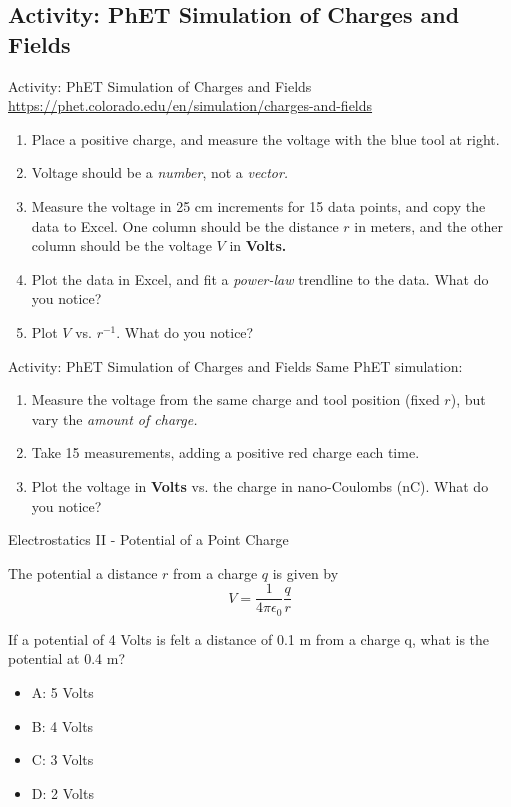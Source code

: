 \documentclass{beamer}
\begin{document}
\subsection{Activity: PhET Simulation of Charges and Fields}

\begin{frame}{Activity: PhET Simulation of Charges and Fields}
\small
\url{https://phet.colorado.edu/en/simulation/charges-and-fields} \\
\begin{enumerate}
\item Place a positive charge, and measure the voltage with the blue tool at right.
\item Voltage should be a \textit{number}, not a \textit{vector.}
\item Measure the voltage in 25 cm increments for 15 data points, and copy the data to Excel.  One column should be the distance $r$ in meters, and the other column should be the voltage $V$ in \textbf{Volts.}
\item Plot the data in Excel, and fit a \textit{power-law} trendline to the data.  What do you notice?
\item Plot $V$ vs. $r^{-1}$.  What do you notice?
\end{enumerate}
\end{frame}

\begin{frame}{Activity: PhET Simulation of Charges and Fields}
Same PhET simulation:
\begin{enumerate}
\item Measure the voltage from the same charge and tool position (fixed $r$), but vary the \textit{amount of charge.}
\item Take 15 measurements, adding a positive red charge each time.
\item Plot the voltage in \textbf{Volts} vs. the charge in nano-Coulombs (nC).  What do you notice?
\end{enumerate}
\end{frame}

\begin{frame}{Electrostatics II - Potential of a Point Charge}
\begin{tcolorbox}[colback=white,colframe=gray,title=Potential of a Point Charge]
The potential a distance $r$ from a charge $q$ is given by
\begin{equation}
\boxed{
V = \frac{1}{4\pi \epsilon_0} \frac{q}{r}} \label{eq:volt2}
\end{equation}
\end{tcolorbox}
If a potential of 4 Volts is felt a distance of 0.1 m from a charge q, what is the potential at 0.4 m?
\begin{itemize}
\item A: 5 Volts
\item B: 4 Volts
\item C: 3 Volts
\item D: 2 Volts
\end{itemize}
\end{frame}
\end{document}
